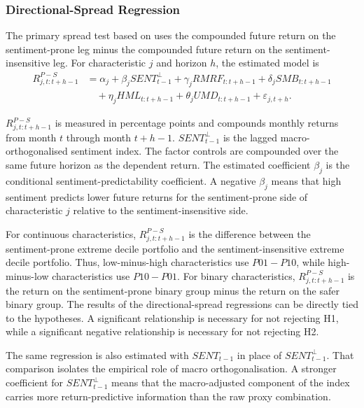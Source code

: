 \documentclass[11pt]{article}
\newcommand{\var}[1]{\ensuremath{#1}}
\begin{document}
\subsubsection{Directional-Spread Regression}
The primary spread test based on \citet{baker2006sentiment} uses the compounded future return on the sentiment-prone leg minus the compounded future return on the sentiment-insensitive leg. For characteristic \var{j} and horizon \var{h}, the estimated model is
\begin{equation}
    \begin{aligned}
    R^{P-S}_{j,t:t+h-1}
    &=
    \alpha_j
    + \beta_j SENT^{\perp}_{t-1}
    + \gamma_j RMRF_{t:t+h-1}
    + \delta_j SMB_{t:t+h-1} \\
    &\quad
    + \eta_j HML_{t:t+h-1}
    + \theta_j UMD_{t:t+h-1}
    + \varepsilon_{j,t+h}.
    \end{aligned}
\end{equation}

\var{R^{P-S}_{j,t:t+h-1}} is measured in percentage points and compounds monthly returns from month \var{t} through month \var{t+h-1}. \var{SENT^{\perp}_{t-1}} is the lagged macro-orthogonalised sentiment index. The factor controls are compounded over the same future horizon as the dependent return. The estimated coefficient \var{\beta_j} is the conditional sentiment-predictability coefficient. A negative \var{\beta_j} means that high sentiment predicts lower future returns for the sentiment-prone side of characteristic \var{j} relative to the sentiment-insensitive side.

For continuous characteristics, \var{R^{P-S}_{j,t:t+h-1}} is the difference between the sentiment-prone extreme decile portfolio and the sentiment-insensitive extreme decile portfolio. Thus, low-minus-high characteristics use \var{P01-P10}, while high-minus-low characteristics use \var{P10-P01}. For binary characteristics, \var{R^{P-S}_{j,t:t+h-1}} is the return on the sentiment-prone binary group minus the return on the safer binary group. The results of the directional-spread regressions can be directly tied to the hypotheses. A significant relationship is necessary for not rejecting H1, while a significant negative relationship is necessary for not rejecting H2. 

The same regression is also estimated with \var{SENT_{t-1}} in place of \var{SENT^{\perp}_{t-1}}. That comparison isolates the empirical role of macro orthogonalisation. A stronger coefficient for \var{SENT^{\perp}_{t-1}} means that the macro-adjusted component of the index carries more return-predictive information than the raw proxy combination.
\end{document}
